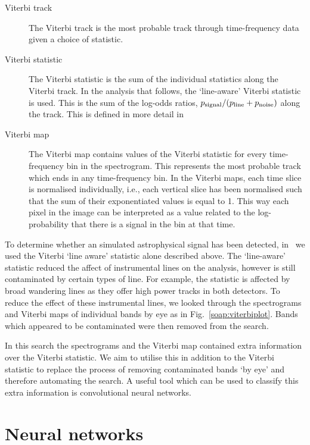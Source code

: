 %
\begin{description} 
	\item [Viterbi track] The Viterbi track is the most probable track through time-frequency data given a choice of statistic. 
	\item [Viterbi statistic] The Viterbi statistic is the sum of the individual statistics along the Viterbi track. In the analysis that follows, the `line-aware' Viterbi statistic is used. 
	This is the sum of the log-odds ratios, $p_{\rm signal}/(p_{\rm line} + p_{\rm noise})$ along the track. This is defined in more detail in \cite{bayley2019SOAPGeneralised}
	\item [Viterbi map]
	The Viterbi map contains values of the Viterbi statistic for every time-frequency bin in the spectrogram. 
	This represents the most probable track which ends in any time-frequency bin.
	In the Viterbi maps, each time slice is normalised individually, i.e., each
	vertical slice has been normalised such that the sum of their exponentiated
	values is equal to 1. This way each pixel in the image can be interpreted as a
	value related to the log-probability that there is a signal in the bin at that
	time.
\end{description}

%
To determine whether an simulated astrophysical signal has been detected,
in~\cite{bayley2019SOAPGeneralised} we used the Viterbi `line aware' statistic alone described above.  
The `line-aware' statistic reduced the affect of instrumental lines on the analysis, however is still contaminated by certain types of line.
For example, the statistic is affected by broad wandering lines as they offer high power tracks in both detectors.
To reduce the effect of these instrumental lines, we looked through the spectrograms and
Viterbi maps of individual bands by eye as in Fig.~\ref{soap:viterbiplot}.
Bands which appeared to be contaminated were then removed from the search.

%
In this search the spectrograms and the Viterbi map contained extra information
over the Viterbi statistic. 
We aim to utilise this in addition to the Viterbi statistic to replace the process of removing contaminated bands `by eye' and therefore automating the search. 
A useful tool which can be used to classify this extra information is convolutional neural networks. 

\section{\label{machine:nn}Neural networks}


